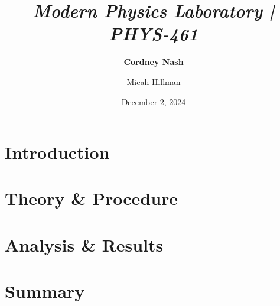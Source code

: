 \documentclass[a4paper,12pt,english]{all-in-one} %
\title{{\large\textit{Modern Physics Laboratory | PHYS-461}}\\[0.5cm]{\Huge\color{gray}\textsc{\@docsubtitle}}}
\author{\textbf{Cordney Nash}  \and Micah Hillman  }
\date{December 2, 2024}
\begin{document}
\begin{titlepage}
\maketitle\vfill
\end{titlepage}
\newpage


\section*{Introduction}
{

}

\begin{multicols}{2}

\section*{Theory \& Procedure}
{

}

\section*{Analysis \& Results}
{

}
\end{multicols}

\section*{Summary}
{

}
\end{document}
